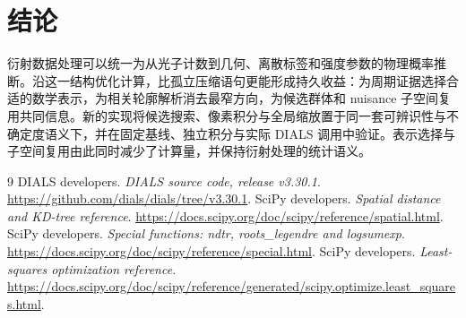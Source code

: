 \documentclass[UTF8,11pt,a4paper,fontset=fandol]{ctexart}
\begin{document}
\section{结论}
衍射数据处理可以统一为从光子计数到几何、离散标签和强度参数的物理概率推断。沿这一结构优化计算，比孤立压缩语句更能形成持久收益：为周期证据选择合适的数学表示，为相关轮廓解析消去最窄方向，为候选群体和 nuisance 子空间复用共同信息。新的实现将候选搜索、像素积分与全局缩放置于同一套可辨识性与不确定度语义下，并在固定基线、独立积分与实际 DIALS 调用中验证。表示选择与子空间复用由此同时减少了计算量，并保持衍射处理的统计语义。

\begin{thebibliography}{9}
 DIALS developers. \emph{DIALS source code, release v3.30.1}. \url{https://github.com/dials/dials/tree/v3.30.1}.
 SciPy developers. \emph{Spatial distance and KD-tree reference}. \url{https://docs.scipy.org/doc/scipy/reference/spatial.html}.
 SciPy developers. \emph{Special functions: ndtr, roots\_legendre and logsumexp}. \url{https://docs.scipy.org/doc/scipy/reference/special.html}.
 SciPy developers. \emph{Least-squares optimization reference}. \url{https://docs.scipy.org/doc/scipy/reference/generated/scipy.optimize.least_squares.html}.
\end{thebibliography}
\end{document}
